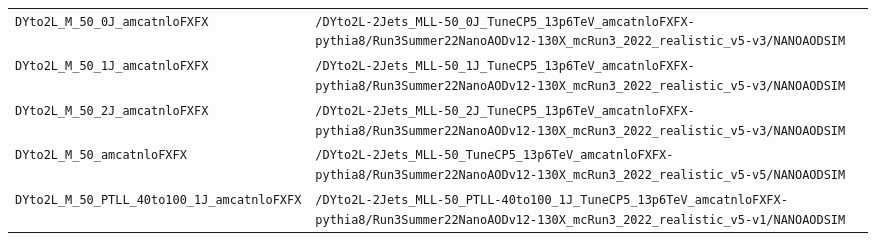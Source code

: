 \begin{longtable}{@{}>{\RaggedRight\arraybackslash}p{} >{\RaggedRight\arraybackslash}p{}@{}}
\addlinespace[2pt]
\texttt{DYto2L\_\allowbreak{}M\_\allowbreak{}50\_\allowbreak{}0J\_\allowbreak{}amcatnloFXFX} & \texttt{/\allowbreak{}DYto2L-\allowbreak{}2Jets\_\allowbreak{}MLL-\allowbreak{}50\_\allowbreak{}0J\_\allowbreak{}TuneCP5\_\allowbreak{}13p6TeV\_\allowbreak{}amcatnloFXFX-\allowbreak{}pythia8/\allowbreak{}Run3Summer22NanoAODv12-\allowbreak{}130X\_\allowbreak{}mcRun3\_\allowbreak{}2022\_\allowbreak{}realistic\_\allowbreak{}v5-\allowbreak{}v3/\allowbreak{}NANOAODSIM} \\
\addlinespace[2pt]
\texttt{DYto2L\_\allowbreak{}M\_\allowbreak{}50\_\allowbreak{}1J\_\allowbreak{}amcatnloFXFX} & \texttt{/\allowbreak{}DYto2L-\allowbreak{}2Jets\_\allowbreak{}MLL-\allowbreak{}50\_\allowbreak{}1J\_\allowbreak{}TuneCP5\_\allowbreak{}13p6TeV\_\allowbreak{}amcatnloFXFX-\allowbreak{}pythia8/\allowbreak{}Run3Summer22NanoAODv12-\allowbreak{}130X\_\allowbreak{}mcRun3\_\allowbreak{}2022\_\allowbreak{}realistic\_\allowbreak{}v5-\allowbreak{}v3/\allowbreak{}NANOAODSIM} \\
\addlinespace[2pt]
\texttt{DYto2L\_\allowbreak{}M\_\allowbreak{}50\_\allowbreak{}2J\_\allowbreak{}amcatnloFXFX} & \texttt{/\allowbreak{}DYto2L-\allowbreak{}2Jets\_\allowbreak{}MLL-\allowbreak{}50\_\allowbreak{}2J\_\allowbreak{}TuneCP5\_\allowbreak{}13p6TeV\_\allowbreak{}amcatnloFXFX-\allowbreak{}pythia8/\allowbreak{}Run3Summer22NanoAODv12-\allowbreak{}130X\_\allowbreak{}mcRun3\_\allowbreak{}2022\_\allowbreak{}realistic\_\allowbreak{}v5-\allowbreak{}v3/\allowbreak{}NANOAODSIM} \\
\addlinespace[2pt]
\texttt{DYto2L\_\allowbreak{}M\_\allowbreak{}50\_\allowbreak{}amcatnloFXFX} & \texttt{/\allowbreak{}DYto2L-\allowbreak{}2Jets\_\allowbreak{}MLL-\allowbreak{}50\_\allowbreak{}TuneCP5\_\allowbreak{}13p6TeV\_\allowbreak{}amcatnloFXFX-\allowbreak{}pythia8/\allowbreak{}Run3Summer22NanoAODv12-\allowbreak{}130X\_\allowbreak{}mcRun3\_\allowbreak{}2022\_\allowbreak{}realistic\_\allowbreak{}v5-\allowbreak{}v5/\allowbreak{}NANOAODSIM} \\
\addlinespace[2pt]
\texttt{DYto2L\_\allowbreak{}M\_\allowbreak{}50\_\allowbreak{}PTLL\_\allowbreak{}40to100\_\allowbreak{}1J\_\allowbreak{}amcatnloFXFX} & \texttt{/\allowbreak{}DYto2L-\allowbreak{}2Jets\_\allowbreak{}MLL-\allowbreak{}50\_\allowbreak{}PTLL-\allowbreak{}40to100\_\allowbreak{}1J\_\allowbreak{}TuneCP5\_\allowbreak{}13p6TeV\_\allowbreak{}amcatnloFXFX-\allowbreak{}pythia8/\allowbreak{}Run3Summer22NanoAODv12-\allowbreak{}130X\_\allowbreak{}mcRun3\_\allowbreak{}2022\_\allowbreak{}realistic\_\allowbreak{}v5-\allowbreak{}v1/\allowbreak{}NANOAODSIM} \\

\end{longtable}
